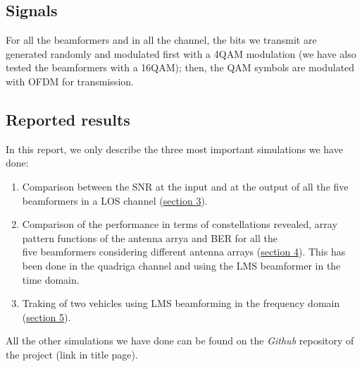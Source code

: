 \subsection{Signals}

For all the beamformers and in all the channel, the bits we transmit are generated randomly and modulated first with a 4\-QAM 
modulation (we have also tested the beamformers with a 16\-QAM); then, the QAM symbols are modulated with OFDM for transmission.

\subsection{Reported results}

In this report, we only describe the three most important simulations we have done:

\begin{enumerate}
    \item Comparison between the SNR at the input and at the output of all the five beamformers in a LOS channel (\hyperref[sec:snr_comparison]{section 3}).
    \item Comparison of the performance in terms of constellations revealed, array pattern functions of the antenna arrya and BER for all the \\ 
            five beamformers considering different antenna arrays (\hyperref[sec:antenna_array_comparison]{section 4}). This has been done in the quadriga channel
            and using the LMS beamformer in the time domain.
    \item Traking of two vehicles using LMS beamforming in the frequency domain (\hyperref[sec:tracking]{section 5}).
\end{enumerate}

All the other simulations we have done can be found on the \textit{Github} repository of the project (link in title page).
